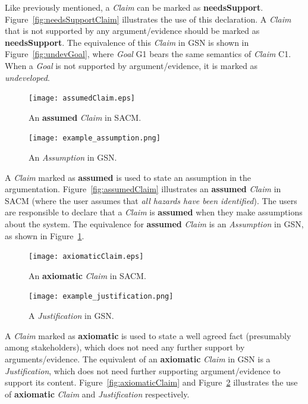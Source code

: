 Like previously mentioned, a \textit{Claim} can be marked as \textbf{needsSupport}. Figure~\ref{fig:needsSupportClaim} illustrates the use of this declaration. A \textit{Claim} that is not supported by any argument/evidence should be marked as \textbf{needsSupport}. The equivalence of this \textit{Claim} in GSN is shown in Figure~\ref{fig:undevGoal}, where \textit{Goal} G1 bears the same semantics of \textit{Claim} C1. When a \textit{Goal} is not supported by argument/evidence, it is marked as \textit{undeveloped}. 

\begin{figure}
	\centering
	\begin{minipage}[b]{0.7\textwidth}
		\texttt{[image: assumedClaim.eps]}
		\caption{An \textbf{assumed} \textit{Claim} in SACM.}
		\label{fig:assumedClaim}
	\end{minipage}
	\hfill
	\begin{minipage}[b]{0.28\textwidth}
		\texttt{[image: example\_assumption.png]}
		\caption{An \textit{Assumption} in GSN.}
		\label{fig:example_assumption}
	\end{minipage}
\end{figure}

A \textit{Claim} marked as \textbf{assumed} is used to state an assumption in the argumentation. Figure~\ref{fig:assumedClaim} illustrates an \textbf{assumed} \textit{Claim} in SACM (where the user assumes that \textit{all hazards have been identified}). The users are responsible to declare that a \textit{Claim} is \textbf{assumed} when they make assumptions about the system. The equivalence for \textbf{assumed} \textit{Claim} is an \textit{Assumption} in GSN, as shown in Figure~\ref{fig:example_assumption}.

\begin{figure}
	\centering
	\begin{minipage}[b]{0.7\textwidth}
		\texttt{[image: axiomaticClaim.eps]}
		\caption{An \textbf{axiomatic} \textit{Claim} in SACM.}
		\label{fig:axiomaticClaim}
	\end{minipage}
	\hfill
	\begin{minipage}[b]{0.28\textwidth}
		\texttt{[image: example\_justification.png]}
		\caption{A \textit{Justification} in GSN.}
		\label{fig:example_justification}
	\end{minipage}
\end{figure}

A \textit{Claim} marked as \textbf{axiomatic} is used to state a well agreed fact (presumably among stakeholders), which does not need any further support by arguments/evidence. The equivalent of an \textbf{axiomatic} \textit{Claim} in GSN is a \textit{Justification}, which does not need further supporting argument/evidence to support its content. Figure~\ref{fig:axiomaticClaim} and Figure~\ref{fig:example_justification} illustrates the use of \textbf{axiomatic} \textit{Claim} and \textit{Justification} respectively.

